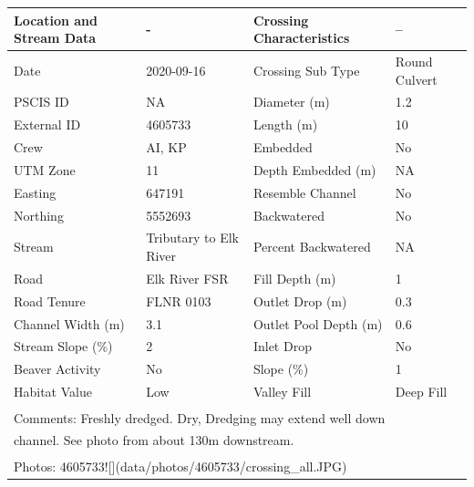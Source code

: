 \documentclass[
]{book}
\begin{document}
\begin{tabular}{l|l|l|l}
\hline
Location and Stream Data & - & Crossing Characteristics & --\\
\hline
Date & 2020-09-16 & Crossing Sub Type & Round Culvert\\
\hline
PSCIS ID & NA & Diameter (m) & 1.2\\
\hline
External ID & 4605733 & Length (m) & 10\\
\hline
Crew & AI, KP & Embedded & No\\
\hline
UTM Zone & 11 & Depth Embedded (m) & NA\\
\hline
Easting & 647191 & Resemble Channel & No\\
\hline
Northing & 5552693 & Backwatered & No\\
\hline
Stream & Tributary to Elk River & Percent Backwatered & NA\\
\hline
Road & Elk River FSR & Fill Depth (m) & 1\\
\hline
Road Tenure & FLNR 0103 & Outlet Drop (m) & 0.3\\
\hline
Channel Width (m) & 3.1 & Outlet Pool Depth (m) & 0.6\\
\hline
Stream Slope (\%) & 2 & Inlet Drop & No\\
\hline
Beaver Activity & No & Slope (\%) & 1\\
\hline
Habitat Value & Low & Valley Fill & Deep Fill\\
\hline
\multicolumn{4}{l}{\textsuperscript{} Comments: Freshly dredged. Dry, Dredging may extend well down}\\
\multicolumn{4}{l}{channel. See photo from about 130m downstream.}\\
\multicolumn{4}{l}{\textsuperscript{} Photos: 4605733![](data/photos/4605733/crossing\_all.JPG)}\\
\end{tabular}
\end{document}
